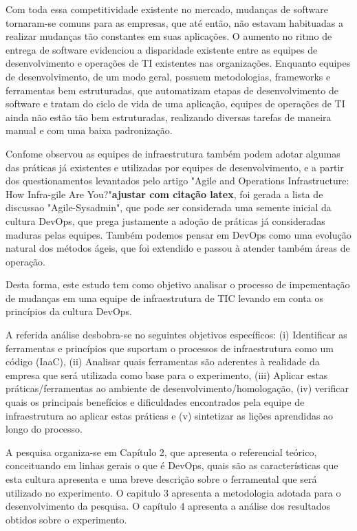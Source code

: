 \documentclass[twoside,english,brazilian]{UNISINOSartigo}
\begin{document}
Com toda essa competitividade existente no mercado, mudanças de software tornaram-se comuns para as empresas, que até então, não estavam habituadas a realizar mudanças tão constantes em suas aplicações. O aumento no ritmo de entrega de software evidenciou a disparidade existente entre as equipes de desenvolvimento e operações de TI existentes nas organizações. Enquanto equipes de desenvolvimento, de um modo geral, possuem metodologias, frameworks e ferramentas bem estruturadas, que automatizam etapas de desenvolvimento de software e tratam do ciclo de vida de uma aplicação, equipes de operações de TI ainda  não estão tão bem estruturadas, realizando diversas tarefas de maneira manual e com uma baixa padronização. 

Confome  observou as equipes de infraestrutura também podem adotar algumas das práticas já existentes e utilizadas por equipes de desenvolvimento, e a partir dos questionamentos levantados pelo artigo "Agile and Operations Infrastructure: How Infra-gile Are You?"\textbf{ajustar com citação latex}, foi gerada a lista de discussao "Agile-Sysadmin", que pode ser considerada uma semente inicial da cultura DevOps, que prega justamente a adoção de práticas já consideradas maduras pelas equipes. Também podemos pensar em DevOps como uma evolução natural dos métodos ágeis, que foi extendido e passou à atender também áreas de operação.

Desta forma, este estudo tem como objetivo analisar o processo de impementação de mudanças em uma equipe de infraestrutura de TIC levando em conta os princípios da cultura DevOps.


A referida análise desbobra-se no seguintes objetivos específicos: (i) Identificar as ferramentas e princípios que suportam o processos de infraestrutura como um código (IaaC), (ii) Analisar quais ferramentas são aderentes à realidade da empresa que será utilizada como base para o experimento, (iii) Aplicar estas práticas/ferramentas ao ambiente de desenvolvimento/homologação, (iv) verificar quais os principais benefícios e dificuldades encontrados pela equipe de infraestrutura ao aplicar estas práticas e (v) sintetizar as lições aprendidas ao longo do processo.

A pesquisa organiza-se em Capítulo 2, que apresenta o referencial teórico, conceituando em linhas gerais o que é DevOps, quais são as características que esta cultura apresenta e uma breve descrição sobre o ferramental que será utilizado no experimento. O capitulo 3 apresenta a metodologia adotada para o desenvolvimento da pesquisa. O capítulo 4 apresenta a análise dos resultados obtidos sobre o experimento.
\end{document}
